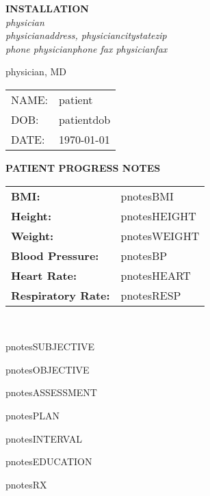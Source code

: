 \documentclass{article}
\newcommand{\sheading}[1]{\textbf{#1:}}
\begin{document}
\begin{center}
	{\textbf{{{INSTALLATION}}}} \\
	{\textsl{{{physician}}}} \\
	\textsl{{{physicianaddress}}, {{physiciancitystatezip}}} \\
	\textsl{phone {{physicianphone}} fax {{physicianfax}}}
\end{center}


{{physician}}, MD \\
\begin{tabular}{ll}
	NAME:	&	{{patient}}	\\
	DOB:	&	{{patientdob}}	\\
	DATE:	&	\today
\end{tabular}

\begin{center}
	{\textbf{PATIENT PROGRESS NOTES}}
\end{center}

\begin{tabular}{ll}
\sheading{BMI} & {{pnotesBMI}} \\
\sheading{Height} & {{pnotesHEIGHT}} \\
\sheading{Weight} & {{pnotesWEIGHT}} \\
\sheading{Blood Pressure} & {{pnotesBP}} \\
\sheading{Heart Rate} & {{pnotesHEART}} \\
\sheading{Respiratory Rate} & {{pnotesRESP}}
\end{tabular} \\
\par

{{pnotesSUBJECTIVE}}

{{pnotesOBJECTIVE}}

{{pnotesASSESSMENT}}

{{pnotesPLAN}}

{{pnotesINTERVAL}}

{{pnotesEDUCATION}}

{{pnotesRX}}
\end{document}
